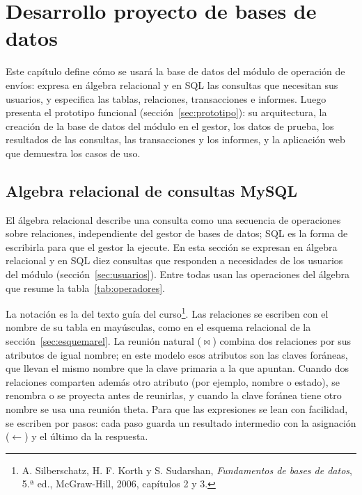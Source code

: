 
\section{Desarrollo proyecto de bases de datos}

Este capítulo define cómo se usará la base de datos del módulo de
operación de envíos: expresa en álgebra relacional y en SQL las
consultas que necesitan sus usuarios, y especifica las tablas,
relaciones, transacciones e informes. Luego presenta el prototipo
funcional (sección~\ref{sec:prototipo}): su arquitectura, la creación de
la base de datos del módulo en el gestor, los datos de prueba, los
resultados de las consultas, las transacciones y los informes, y la
aplicación web que demuestra los casos de uso.

\subsection{Algebra relacional de consultas MySQL}
\label{sec:algebra}

El álgebra relacional describe una consulta como una secuencia de
operaciones sobre relaciones, independiente del gestor de bases de
datos; SQL es la forma de escribirla para que el gestor la ejecute. En
esta sección se expresan en álgebra relacional y en SQL diez consultas
que responden a necesidades de los usuarios del módulo
(sección~\ref{sec:usuarios}). Entre todas usan las operaciones del
álgebra que resume la tabla~\ref{tab:operadores}.

La notación es la del texto guía del curso\footnote{A. Silberschatz,
H. F. Korth y S. Sudarshan, \textit{Fundamentos de bases de datos},
5.ª ed., McGraw-Hill, 2006, capítulos 2 y 3.}. Las relaciones se
escriben con el nombre de su tabla en mayúsculas, como en el esquema
relacional de la sección~\ref{sec:esquemarel}. La reunión natural
($\bowtie$) combina dos relaciones por sus atributos de igual nombre;
en este modelo esos atributos son las claves foráneas, que llevan el
mismo nombre que la clave primaria a la que apuntan. Cuando dos
relaciones comparten además otro atributo (por ejemplo, nombre o
estado), se renombra o se proyecta antes de reunirlas, y cuando la
clave foránea tiene otro nombre se usa una reunión theta. Para que las
expresiones se lean con facilidad, se escriben por pasos: cada paso
guarda un resultado intermedio con la asignación ($\leftarrow$) y el
último da la respuesta.

